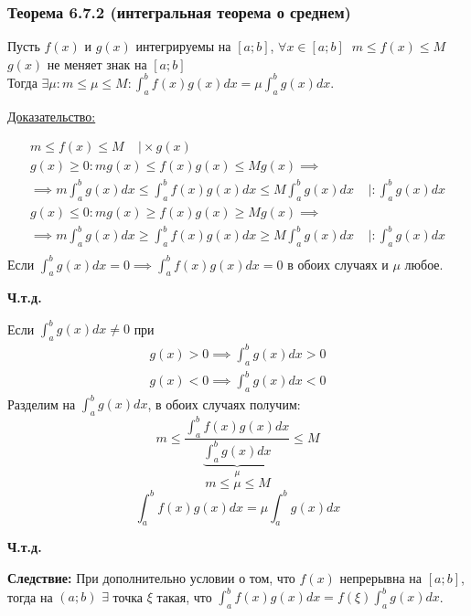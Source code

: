 \documentclass[12pt]{article}
\begin{document}
    \subsubsection*{Теорема 6.7.2 (интегральная теорема о среднем)}\label{th:6.7.2}
    Пусть $f(x)$ и $g(x)$ интегрируемы на $[a;b]$, $\forall x \in [a;b]\;\; m \leq f(x) \leq M$ $g(x)$ не меняет знак на $[a;b]$\\
    Тогда $\exists \mu : m\leq \mu \leq M: \int_{a}^{b} f(x)g(x)dx = \mu \int_{a}^{b}g(x)dx$.\par\noindent
    \underline{Доказательство:}
    \begin{adjustwidth}{1.5em}{1.5em}
        \begin{gather*}
            m \leq f(x) \leq M\;\;\;\; \Big| \times g(x)\\
            g(x)\geq 0 : mg(x)\leq f(x)g(x)\leq Mg(x) \implies\\
            \implies m \int_{a}^{b} g(x) dx \leq \int_{a}^{b}f(x)g(x)dx \leq M \int_{a}^{b}g(x)dx \;\;\;\; \Big| : \int_{a}^{b} g(x)dx\\
            g(x)\leq 0 : mg(x)\geq f(x)g(x)\geq Mg(x) \implies\\
            \implies m \int_{a}^{b} g(x) dx \geq \int_{a}^{b}f(x)g(x)dx \geq M \int_{a}^{b}g(x)dx \;\;\;\; \Big| : \int_{a}^{b} g(x)dx\\
        \end{gather*}
        Если $\int_{a}^{b} g(x)dx = 0 \implies \int_{a}^{b} f(x)g(x)dx =0$ в обоих случаях и $\mu$ любое. 
        \begin{center}
            \textbf{Ч.т.д.}
        \end{center}
        Если $\int_{a}^{b} g(x) dx \ne 0$ при 
        \[ \begin{matrix}
            g(x) > 0 \implies \int_{a}^{b} g(x)dx >0\\
            g(x)<0 \implies \int_{a}^{b} g(x)dx<0
        \end{matrix} \]
        Разделим на $\int_{a}^{b} g(x)dx$, в обоих случаях получим: 
        \[ m \leq \frac{\int_{a}^{b}f(x)g(x)dx}{\underbrace{\int_{a}^{b}g(x)dx}_{\mu}}\leq M \]
        \[ m\leq \mu \leq M \] 
        \[ \int_{a}^{b} f(x)g(x)dx=\mu\int_{a}^{b}g(x)dx \]
        \begin{center}
            \textbf{Ч.т.д.}
        \end{center}
        \textbf{Следствие:} При дополнительно условии о том, что $f(x)$ непрерывна на $[a;b]$, тогда на $(a;b)$ $\exists$ точка $\xi$ такая, что $\int_{a}^{b}f(x)g(x)dx=f(\xi)\int_{a}^{b}g(x)dx$.\\

\end{adjustwidth}
\end{document}
